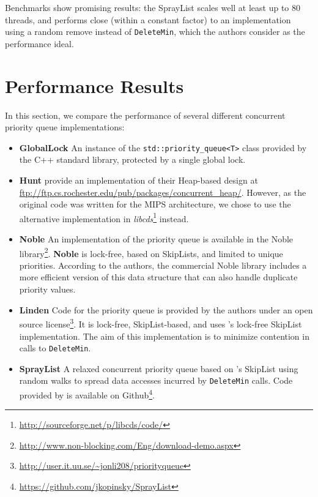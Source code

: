 \documentclass[a4paper,10pt]{article}
\begin{document}
Benchmarks show promising results: the SprayList scales well at least up to 80 threads,
and performs close (within a constant factor) to an implementation using a random remove instead
of \lstinline|DeleteMin|, which the authors consider as the performance ideal.


\section{Performance Results}

In this section, we compare the performance of several different concurrent priority
queue implementations:

\begin{itemize}
\item \textbf{GlobalLock} An instance of the \lstinline|std::priority_queue<T>| class provided
      by the C++ standard library, protected by a single global lock.
\item \textbf{Hunt} \citeauthor{hunt1996efficient} provide an implementation
      of their Heap-based design \cite{hunt1996efficient} at \url{ftp://ftp.cs.rochester.edu/pub/packages/concurrent_heap/}.
      However, as the original code was written for the MIPS architecture, we chose to
      use the alternative implementation in \emph{libcds}\footnote{\url{http://sourceforge.net/p/libcds/code/}}
      instead.
\item \textbf{Noble} An implementation of the \citeauthor{sundell2003fast} priority queue \cite{sundell2003fast}
      is available in the Noble library\footnote{\url{http://www.non-blocking.com/Eng/download-demo.aspx}}.
      \textbf{Noble} is lock-free, based on SkipLists, and limited to unique priorities.
      According to the authors, the commercial Noble library includes a more efficient
      version of this data structure that can also handle duplicate priority values.
\item \textbf{Linden} Code for the \citeauthor{linden2013skiplist} priority queue \cite{linden2013skiplist}
      is provided by the authors under an open source license\footnote{\url{http://user.it.uu.se/~jonli208/priorityqueue}}.
      It is lock-free, SkipList-based, and uses \citeauthor{fraser2004practical}'s lock-free
      SkipList implementation. The aim of this implementation is to minimize contention in
      calls to \lstinline|DeleteMin|.
\item \textbf{SprayList} A relaxed concurrent priority queue based on \citeauthor{fraser2004practical}'s
      SkipList using random walks to spread data accesses
      incurred by \lstinline|DeleteMin| calls. Code provided by \citeauthor{alistarhspraylist} is
      available on Github\footnote{\url{https://github.com/jkopinsky/SprayList}}.
\end{itemize}
\end{document}
